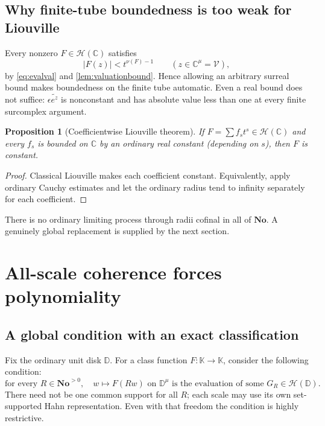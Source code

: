 \documentclass[11pt,oneside]{article}
\numberwithin{equation}{section}
\newtheorem{proposition}[theorem]{Proposition}
\theoremstyle{definition}
\theoremstyle{remark}\newtheorem{remark}[theorem]{Remark}
\newcommand{\No}{\mathbf{No}}
\newcommand{\K}{\mathbb K}
\newcommand{\C}{\mathbb C}
\newcommand{\HH}{\mathscr H}
\newcommand{\fin}{\mathcal V}
\newcommand{\Disk}{\mathbb D}
\begin{document}
\subsection{Why finite-tube boundedness is too weak for Liouville}
Every nonzero $F\in\HH(\C)$ satisfies
\begin{equation}\label{eq:automaticbound}
 |F(z)|<t^{\nu(F)-1}\qquad(z\in\C^\mu=\fin),
\end{equation}
by \eqref{eq:evalval} and \cref{lem:valuationbound}. Hence allowing an
arbitrary surreal bound makes boundedness on the finite tube automatic.
Even a real bound does not suffice: $\epsilon\widetilde{e^z}$ is
nonconstant and has absolute value less than one at every finite
surcomplex argument.

\begin{proposition}[Coefficientwise Liouville theorem]
If $F=\sum f_s t^s\in\HH(\C)$ and every $f_s$ is bounded on $\C$
by an ordinary real constant (depending on $s$), then $F$ is constant.
\end{proposition}
\begin{proof}
Classical Liouville makes each coefficient constant. Equivalently, apply
ordinary Cauchy estimates and let the ordinary radius tend to infinity
separately for each coefficient.
\end{proof}
There is no ordinary limiting process through radii cofinal in all of
$\No$. A genuinely global replacement is supplied by the next section.

\section{All-scale coherence forces polynomiality}\label{sec:rigidity}
\subsection{A global condition with an exact classification}
Fix the ordinary unit disk $\Disk$. For a class function $F:\K\to\K$,
consider the following condition:
\begin{equation}\label{eq:allscale}
 \text{for every }R\in\No^{>0},\quad
 w\longmapsto F(Rw)\text{ on }\Disk^\mu
 \text{ is the evaluation of some }G_R\in\HH(\Disk).
\end{equation}
There need not be one common support for all $R$; each scale may use its
own set-supported Hahn representation. Even with that freedom the
condition is highly restrictive.
\end{document}
